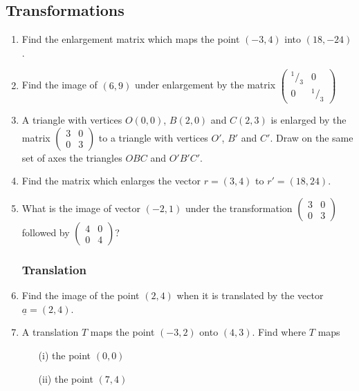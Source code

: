 	\subsection{Transformations} \label{f4trans}
\begin{enumerate}

		\subsubsection{Enlargement}
	\item Find the enlargement matrix which maps the point $(-3,4)$ into $(18,-24)$.
	
	\item Find the image of $(6,9)$ under enlargement by the matrix $
	\begin{pmatrix}
	^1/_3 & 0 \\
	0 & ^1/_3
	\end{pmatrix}$
	
	\item A triangle with vertices $O(0,0)$, $B(2,0)$ and $C(2,3)$ is enlarged by the matrix
	$
	\begin{pmatrix}
	3 & 0 \\
	0 & 3
	\end{pmatrix}$
	 to a triangle with vertices $O'$, $B'$ and $C'$. Draw on the same set of axes the triangles $OBC$ and $O'B'C'$.
	 
	 \item Find the matrix which enlarges the vector $r = (3,4)$ to $r' = (18,24)$.
	 
	 \item What is the image of vector $(-2,1)$ under the transformation $
	\begin{pmatrix}
	3 & 0 \\
	0 & 3
	\end{pmatrix}$ followed by $\begin{pmatrix}
	4 & 0 \\
	0 & 4
	\end{pmatrix}$?
	 
	 
	 	\subsubsection{Translation}
	 	
	 \item Find the image of the point $(2,4)$ when it is translated by the vector $\underline{a} = (2,4)$.
	 	
	 \item A translation $T$ maps the point $(-3,2)$ onto $(4,3)$. Find where $T$ maps
	 	\begin{itemize}
	 	\item[(i)] the point $(0,0)$
	 	\item[(ii)] the point $(7,4)$
	 	\end{itemize}


\end{enumerate}
